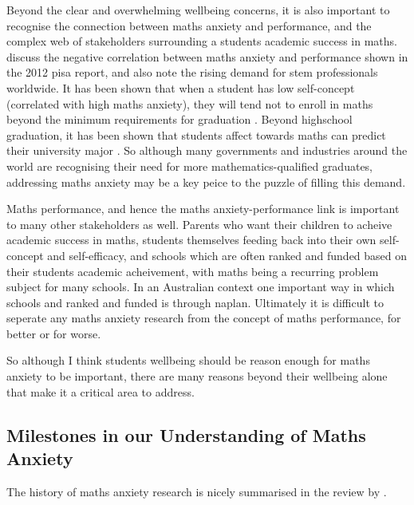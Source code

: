 \documentclass[14pt]{memoir}
\begin{document}
Beyond the clear and overwhelming wellbeing concerns, it is also important to recognise the connection between maths anxiety and performance, and the complex web of stakeholders surrounding a students academic success in maths.  discuss the negative correlation between maths anxiety and performance shown in the 2012 \gls{pisa} \cite{PISA2013} report, and also note the rising demand for \gls{stem} professionals worldwide. It has been shown that when a student has low self-concept (correlated with high maths anxiety), they will tend not to enroll in maths beyond the minimum requirements for graduation \cite{Ashcraft2007}. Beyond highschool graduation, it has been shown that students affect towards maths can predict their university major \cite{LeFevre1992}. So although many governments and industries around the world are recognising their need for more mathematics-qualified graduates, addressing maths anxiety may be a key peice to the puzzle of filling this demand.

Maths performance, and hence the maths anxiety-performance link is important to many other stakeholders as well. Parents who want their children to acheive academic success in maths, students themselves feeding back into their own self-concept and self-efficacy, and schools which are often ranked and funded based on their students academic acheivement, with maths being a recurring problem subject for many schools. In an Australian context one important way in which schools and ranked and funded is through \gls{naplan}. Ultimately it is difficult to seperate any maths anxiety research from the concept of maths performance, for better or for worse.

So although I think students wellbeing should be reason enough for maths anxiety to be important, there are many reasons beyond their wellbeing alone that make it a critical area to address.

\subsection*{Milestones in our Understanding of Maths Anxiety}

The history of maths anxiety research is nicely summarised in the review by \cite{Pellicioni2016}.
\end{document}
